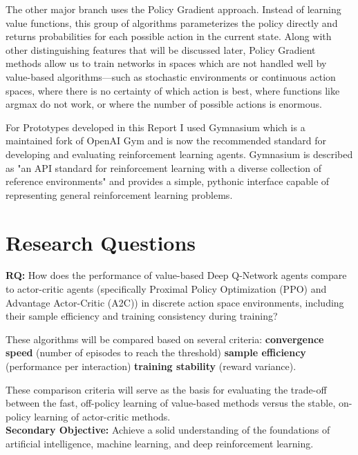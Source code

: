 
The other major branch uses the Policy Gradient approach. Instead of learning value functions, this group of algorithms parameterizes the policy directly and returns probabilities for each possible action in the current state. Along with other distinguishing features that will be discussed later, Policy Gradient methods allow us to train networks in spaces which are not handled well by value-based algorithms—such as stochastic environments or continuous action spaces, where there is no certainty of which action is best, where functions like argmax do not work, or where the number of possible actions is enormous.


For Prototypes developed in this Report I used Gymnasium which is a maintained fork of OpenAI Gym and is now the recommended standard for developing and evaluating reinforcement learning agents. Gymnasium is described as "an API standard for reinforcement learning with a diverse collection of reference environments" and provides a simple, pythonic interface capable of representing general reinforcement learning problems. 


\section{Research Questions}

\textbf{RQ:} How does the performance of value-based Deep Q-Network agents compare to actor-critic agents (specifically Proximal Policy Optimization (PPO) and Advantage Actor-Critic (A2C)) in discrete action space environments, including their sample efficiency and training consistency during training?


These algorithms will be compared based on several criteria: 
\textbf{convergence speed} (number of episodes to reach the threshold)
\textbf{sample efficiency} (performance per interaction)
\textbf{training stability }(reward variance). 

These comparison criteria will serve as the basis for evaluating the trade-off between the fast, off-policy learning of value-based methods versus the stable, on-policy learning of actor-critic methods. \\

\textbf{Secondary Objective:} Achieve a solid understanding of the foundations of artificial intelligence, machine learning, and deep reinforcement learning.










